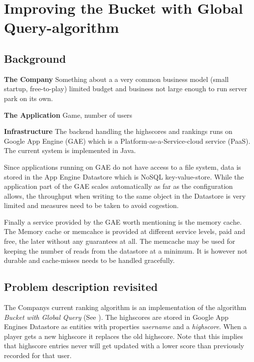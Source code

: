 \chapter{\label{method}Improving the Bucket with Global\\Query-algorithm}


\section{Background}

\textbf{The Company}  Something about a a very common business model (small startup, free-to-play) limited budget and business not large enough to run server park on its own.

\textbf{The Application} Game, number of users

\textbf{Infrastructure} The backend handling the highscores and rankings runs on Google App Engine (GAE) which is a Platform-as-a-Service-cloud service (PaaS). The current system is implemented in Java.

Since applications running on GAE do not have access to a file system, data is stored in the App Engine Datastore which is NoSQL key-value-store. While the application part of the GAE scales automatically as far as the configuration allows, the throughput when writing to the same object in the Datastore is very limited and measures need to be taken to avoid cogestion. 

Finally a service provided by the GAE worth mentioning is the memory cache. The Memory cache or memcahce is provided at different service levels, paid and free, the later without any guarantees at all. The memcache may be used for keeping the number of reads from the datastore at a minimum. It is however not durable and cache-misses needs to be handled gracefully.

\section{Problem description revisited}

The Companys current ranking algorithm is an implementation of the algorithm \emph{Bucket with Global Query} (See ). The highscores are stored in Google App Engines Datastore as entities with properties \emph{username} and a \emph{highscore}. When a player gets a new highscore it replaces the old highscore. Note that this implies that highscore entries never will get updated with a lower score than previously recorded for that user.

